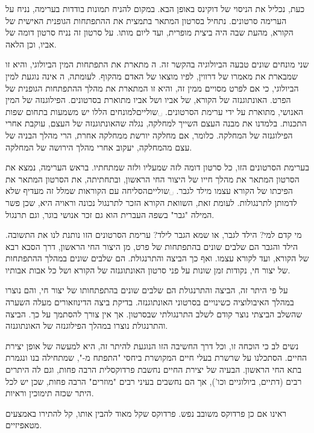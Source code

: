 \begin{enumerate}
כעת, נכליל את הניסוי של דוקינס באופן הבא. במקום להניח תמונות בודדות בערימה, נניח על הערימה סרטונים. נתחיל בסרטון המתאר בתמצית את ההתפתחות הגופנית האישית של הקורא, מהעת שבה היה ביצית מופרית, ועד ליום מותו. על סרטון זה נניח סרטון דומה של אביו, וכן הלאה.

שני מונחים שונים טבעה הביולוגיה בהקשר זה. ה מתארת את התפתחות המין הביולוגי, והיא זו שמבארת את מאמרו של דרווין, לפיו מוצאו של האדם מהקוף. לעומתה, ה אינה נוגעת למין הביולוגי, כי אם לפרט מסויים ממין זה, והיא זו המתארת את מהלך ההתפתחות הגופנית של הפרט. האונתוגנזה של הקורא, של אביו ושל אביו מתוארת בסרטונים. הפילוגנזה של המין האנושי, מתוארת על ידי ערימת הסרטונים. ␣שוליים{למונחים הללו יש משמעות בתחום שפות התכנות. בלמדנו את מבנה העצם השייך למחלקה, נגלה שהאונתוגנזה של העצם, עוקבת אחרי הפילוגנזה של המחלקה. כלומר, אם מחלקה יורשת ממחלקה אחרת, הרי מהלך הבניה של עצם מהמחלקה, יעקוב אחרי מהלך הירושה של המחלקה.}

בערימת הסרטונים הזו, כל סרטון דומה לזה שמעליו ולזה שמתחתיו. בראש הערימה, נמצא את הסרטון המתאר את מהלך חייו של היצור החי הראשון, ובתחתיתה, את הסרטון המתאר את הפיכתו של הקורא עצמו מילד לגבר. ␣שוליים{הסליחה עם הקוראות שמלל זה מעדיף שלא לדמותן לתרנגולות. לעומת זאת, השוואת הקורא הזכר לתרנגול נכונה וראויה היא, שכן פשר המילה "גבר" בשפה העברית הוא גם זכר אנושי בוגר, וגם תרנגול.}

מי קדם למי? הילד לגבר, או שמא הגבר לילד? ערימת הסרטונים הזו נותנת לנו את התשובה. הילד והגבר הם שלבים שונים בהתפתחות של פרט, מן היצור החי הראשון, דרך הסבא רבא של הקורא, ועד לקורא עצמו. ואף כך הביצה והתרנגולת. הם שלבים שונים במהלך ההתפתחות של יצור חי, נקודות זמן שונות על פני סרטון האונתוגנזה של הקורא ושל כל אבות אבותיו.

על פי היתר זה, הביצה והתרנגולת הם שלבים שונים בהתפתחותו של יצור חי, והם נוצרו במהלך האיבולוציה כשינויים בסרטוני האונתוגנזה. בדיקת ביצה הדינוזאורים מעלה השערה שהשלב הביצתי נוצר קודם לשלב התרנגולתי שבסרטון. אך אין צורך להסתמך על כך. הביצה והתרנגולת נוצרו במהלך הפילוגנזה של האונתוגנזה.

נשים לב כי הוכחה זו, וכל דרך החשיבה הזו הנוגעת להיתר זה, היא למעשה  של אופן יצירת החיים. הסתכלנו על שרשרת בעלי חיים המקושרת ביחסי "התפתח מ-", שמתחילה בנו ונגמרת בתא החי הראשון. הבעיה של יצירת החיים נחשבת פרדוקסלית הרבה פחות, וגם לה היתרים רבים (דתיים, ביולוגיים וכו'), אך הם נחשבים בעיני רבים "מוזרים" הרבה פחות, שכן יש לכל היתר שכזה תימוכין וראיות.
\end{enumerate}
ראינו אם כן פרדוקס משובב נפש. פרדוקס שקל מאוד להבין אותו, קל להתירו באמצעים מטאפיזיים.


